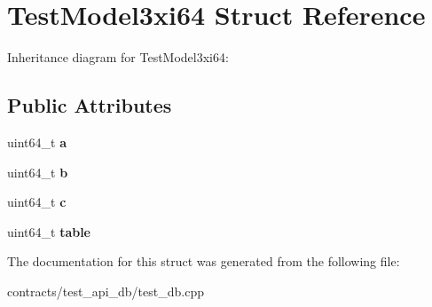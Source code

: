 \hypertarget{struct_test_model3xi64}{}\section{Test\+Model3xi64 Struct Reference}
\label{struct_test_model3xi64}


Inheritance diagram for Test\+Model3xi64\+:
\subsection*{Public Attributes}
\begin{DoxyCompactItemize}
\item 
\mbox{\label{struct_test_model3xi64_aea523fe114c14a8759471342235c5ae8}} 
uint64\+\_\+t {\bfseries a}
\item 
\mbox{\label{struct_test_model3xi64_ae5d2cf31bb5c565e0b7b5c1c91b9f414}} 
uint64\+\_\+t {\bfseries b}
\item 
\mbox{\label{struct_test_model3xi64_ad774e8c5f27a061e2c29e7ff009e6af8}} 
uint64\+\_\+t {\bfseries c}
\item 
\mbox{\label{struct_test_model3xi64_a7ec8a7efd660e872ec1007b70f34ee9f}} 
uint64\+\_\+t {\bfseries table}
\end{DoxyCompactItemize}


The documentation for this struct was generated from the following file\+:\begin{DoxyCompactItemize}
\item 
contracts/test\+\_\+api\+\_\+db/test\+\_\+db.\+cpp\end{DoxyCompactItemize}
